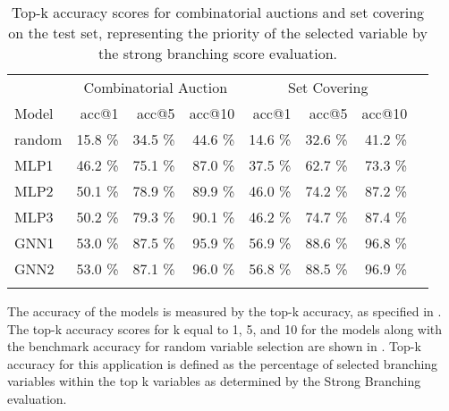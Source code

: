 \begin{scriptsize}
\begin{table}[ht]
	\centering
	\begin{tabular}{lrrrrrrr}
		\toprule
		& \multicolumn{3}{c}{Combinatorial Auction} & \multicolumn{3}{c}{Set Covering}\\ 
		\cmidrule(lr){2-4} \cmidrule(lr){5-7}
		Model & acc@1 & acc@5 & acc@10 & acc@1 & acc@5 & acc@10 \\
		\midrule
		random & 15.8 \% & 34.5 \% & 44.6 \% & 14.6 \% & 32.6 \% & 41.2 \%\\
		MLP1 & 46.2 \% & 75.1 \% & 87.0 \% & 37.5 \% & 62.7 \% & 73.3 \%\\
		MLP2 & 50.1 \% & 78.9 \% & 89.9 \% & 46.0 \% & 74.2 \% & 87.2 \%\\
		MLP3 & 50.2 \% & 79.3 \% & 90.1 \% & 46.2 \% & 74.7 \% & 87.4 \%\\
		GNN1 & 53.0 \% & 87.5 \% & 95.9 \% & 56.9 \% & 88.6 \% & 96.8 \%\\
		GNN2 & 53.0 \% & 87.1 \% & 96.0 \% & 56.8 \% & 88.5 \% & 96.9 \%\\
		\addlinespace
		\bottomrule
	\end{tabular}
	\caption{Top-k accuracy scores for combinatorial auctions and set covering on the test set, representing the priority of the selected variable by the strong branching score evaluation.}\label{tab:accs}
\end{table}
\end{scriptsize}

 
The accuracy of the models is measured by the top-k accuracy, as specified in .
The top-k accuracy scores for k equal to 1, 5, and 10 for the models along with the benchmark accuracy for random variable selection are shown in . Top-k accuracy for this application is defined as the percentage of selected branching variables within the top k variables as determined by the Strong Branching evaluation. 

